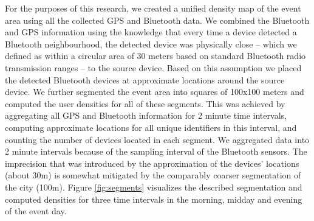 \documentclass[12pt,a4paper,twoside,openright]{book}
\begin{document}
For the purposes of this research, we created a unified density map of the event area using all the collected GPS and Bluetooth data.
%
We combined the Bluetooth and GPS information using the knowledge that every time a device detected a Bluetooth neighbourhood, the detected device was physically close -- which we defined as within a circular area of 30 meters based on standard Bluetooth radio transmission ranges -- to the source device.
%
Based on this assumption we placed the detected Bluetooth devices at approximate locations around the source device.
%
We further segmented the event area into squares of 100x100 meters and computed the user densities for all of these segments.
%
This was achieved by aggregating all GPS and Bluetooth information for 2 minute time intervals, computing approximate locations for all unique identifiers in this interval, and counting the number of devices located in each segment.
%
We aggregated data into 2 minute intervals because of the sampling interval of the Bluetooth sensors.
%
The imprecision that was introduced by the approximation of the devices' locations (about 30m) is somewhat mitigated by the comparably coarser segmentation of the city (100m).
%
Figure \ref{fig:segments} visualizes the described segmentation and computed densities for three time intervals in the morning, midday and evening of the event day.
\end{document}
